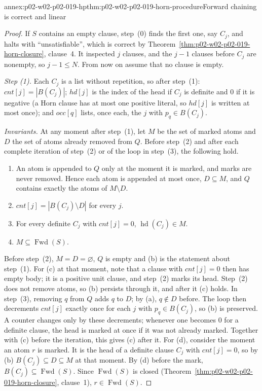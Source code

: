 \begin{annexitem}{annex:p02-w02-p02-019-hp}{thm:p02-w02-p02-019-horn-procedure}{Forward chaining is correct and linear}
\begin{proof}
If \(S\) contains an empty clause, step~(0) finds the first one, say \(C_j\),
and halts with ``unsatisfiable'', which is correct by
Theorem~\ref{thm:p02-w02-p02-019-horn-closure}, clause~4.  It inspected
\(j\) clauses, and the \(j-1\) clauses before \(C_j\) are nonempty, so
\(j-1\leq N\).  From now on assume that no clause is empty.

\emph{Step (1).}  Each \(C_j\) is a list without repetition, so after
step~(1): \(\mathit{cnt}[j]=|B(C_j)|\); \(\mathit{hd}[j]\) is the index of the
head if \(C_j\) is definite and \(0\) if it is negative (a Horn clause has at
most one positive literal, so \(\mathit{hd}[j]\) is written at most once); and
\(\mathit{occ}[q]\) lists, once each, the \(j\) with \(p_q\in B(C_j)\).

\emph{Invariants.}  At any moment after step~(1), let \(M\) be the set of
marked atoms and \(D\) the set of atoms already removed from \(Q\).  Before
step~(2) and after each complete iteration of step~(2) or of the loop in
step~(3), the following hold.
\begin{enumerate}
  \item[(a)] An atom is appended to \(Q\) only at the moment it is marked,
        and marks are never removed.  Hence each atom is appended at most
        once, \(D\subseteq M\), and \(Q\) contains exactly the atoms of
        \(M\setminus D\).
  \item[(b)] \(\mathit{cnt}[j]=|B(C_j)\setminus D|\) for every \(j\).
  \item[(c)] For every definite \(C_j\) with \(\mathit{cnt}[j]=0\),
        \(\operatorname{hd}(C_j)\in M\).
  \item[(d)] \(M\subseteq\operatorname{Fwd}(S)\).
\end{enumerate}
Before step~(2), \(M=D=\varnothing\), \(Q\) is empty and (b) is the
statement about step~(1).  For (c) at that moment, note that a clause with
\(\mathit{cnt}[j]=0\) then has empty body; it is a positive unit clause, and
step~(2) marks its head.  Step~(2) does not remove atoms, so (b) persists
through it, and after it (c) holds.  In step~(3), removing \(q\) from \(Q\)
adds \(q\) to \(D\); by (a), \(q\notin D\) before.  The loop then decrements
\(\mathit{cnt}[j]\) exactly once for each \(j\) with \(p_q\in B(C_j)\), so
(b) is preserved.  A counter changes only by these decrements; whenever one
becomes \(0\) for a definite clause, the head is marked at once if it was not
already marked.  Together with (c) before the iteration, this gives (c) after
it.  For (d), consider the moment an atom \(r\) is marked.  It is the head of
a definite clause \(C_j\) with \(\mathit{cnt}[j]=0\), so by (b)
\(B(C_j)\subseteq D\subseteq M\) at that moment.  By (d) before the mark,
\(B(C_j)\subseteq\operatorname{Fwd}(S)\).  Since \(\operatorname{Fwd}(S)\) is
closed (Theorem~\ref{thm:p02-w02-p02-019-horn-closure}, clause~1),
\(r\in\operatorname{Fwd}(S)\).


\end{proof}
\end{annexitem}
